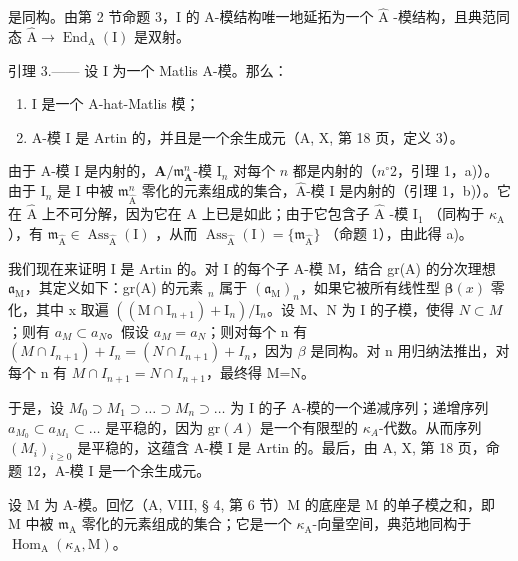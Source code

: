 是同构。由第 2 节命题 3，I 的 A-模结构唯一地延拓为一个 \(\widehat{\mathrm{A}}\) -模结构，且典范同态 \(\widehat{\mathrm{A}} \to \operatorname{End}_{\mathrm{A}}(\mathrm{I})\) 是双射。

引理 3.—— 设 I 为一个 Matlis A-模。那么：

\begin{enumerate}
\def\labelenumi{\alph{enumi})}
\item
  I 是一个 A-hat-Matlis 模；
\item
  A-模 I 是 Artin 的，并且是一个余生成元（A, X, 第 18 页，定义 3）。
\end{enumerate}

由于 A-模 I 是内射的，\(\mathbf{A} / \mathfrak{m}_{\mathbf{A}}^{n}\)-模 \(\mathrm{I}_n\) 对每个 \(n\) 都是内射的（\(n^{\circ}2\)，引理 1，a)）。由于 \(\mathrm{I}_n\) 是 I 中被 \(\mathfrak{m}_{\widehat{\mathrm{A}}}^{n}\) 零化的元素组成的集合，\(\widehat{\mathrm{A}}\)-模 I 是内射的（引理 1，b)）。它在 \(\widehat{\mathrm{A}}\) 上不可分解，因为它在 \(\mathrm{A}\) 上已是如此；由于它包含子 \(\widehat{\mathrm{A}}\) -模 \(\mathrm{I}_1\) （同构于 \(\kappa_{\mathrm{A}}\) ），有 \(\mathfrak{m}_{\widehat{\mathrm{A}}} \in \operatorname{Ass}_{\widehat{\mathrm{A}}}(\mathrm{I})\) ，从而 \(\operatorname{Ass}_{\widehat{\mathrm{A}}}(\mathrm{I}) = \{\mathfrak{m}_{\widehat{\mathrm{A}}}\}\) （命题 1），由此得 a)。

我们现在来证明 I 是 Artin 的。对 I 的每个子 A-模 M，结合 gr(A) 的分次理想 \(\mathfrak{a}_{\mathrm{M}}\)，其定义如下：gr(A) 的元素 \(_n\) 属于 \((\mathfrak{a}_{\mathrm{M}})_{n}\)，如果它被所有线性型 \(\boldsymbol{\beta}(x)\) 零化，其中 x 取遍 \(\left((\mathrm{M}\cap\mathrm{I}_{n+1})+\mathrm{I}_{n}\right)/\mathrm{I}_{n}\)。设 M、N 为 I 的子模，使得 \(N\subset M\)；则有 \(a_{M}\subset a_{N}\)。假设 \(a_{M}=a_{N}\)；则对每个 n 有 \((M\cap I_{n+1})+I_{n}=(N\cap I_{n+1})+I_{n}\)，因为 \(\beta\) 是同构。对 n 用归纳法推出，对每个 n 有 \(M\cap I_{n+1}=N\cap I_{n+1}\)，最终得 M=N。

于是，设 \(M_{0} \supset M_{1} \supset \ldots \supset M_{n} \supset \ldots\) 为 I 的子 A-模的一个递减序列；递增序列 \(a_{M_{0}} \subset a_{M_{1}} \subset \ldots\) 是平稳的，因为 \(\text{gr}(A)\) 是一个有限型的 \(\kappa_{A}\)-代数。从而序列 \((M_{i})_{i \geqslant 0}\) 是平稳的，这蕴含 A-模 I 是 Artin 的。最后，由 A, X, 第 18 页，命题 12，A-模 I 是一个余生成元。

设 M 为 A-模。回忆（A, VIII, § 4, 第 6 节）M 的底座是 M 的单子模之和，即 M 中被 \(\mathfrak{m}_{\mathrm{A}}\) 零化的元素组成的集合；它是一个 \(\kappa_{\mathrm{A}}\)-向量空间，典范地同构于 \(\operatorname{Hom}_{\mathrm{A}}(\kappa_{\mathrm{A}}, \mathrm{M})\)。

